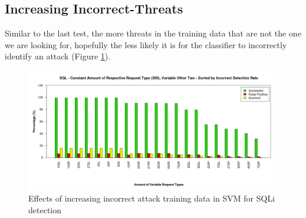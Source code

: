 \newpage
\subsection{Increasing Incorrect-Threats}

Similar to the last test, the more threats in the training data that are not the one we are looking for, hopefully the less likely it is for the classifier to incorrectly identify an attack (Figure \ref{fig:resIncorrect}).

\begin{figure}[hb]
	\centering
	\includegraphics[width=450px]{./assets/results/svm/incorrect/Results_SQL.png}
	\caption{Effects of increasing incorrect attack training data in SVM for SQLi detection}
	\label{fig:resIncorrect}
\end{figure}



